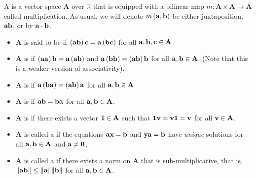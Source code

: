 \begin{dfn}
    A  is a vector space \( \mathbf{A} \) over \( \mathbb{R} \) that is equipped with a bilinear map \( m: \mathbf{A} \times \mathbf{A} \to \mathbf{A} \) called multiplication. As usual, we will denote \( m \left( \vb{a}, \vb{b} \right) \) be either juxtaposition, \( \vb{a} \vb{b} \), or by \( \vb{a} \cdot \vb{b} \). 
    \begin{itemize}
        \item \( \mathbf{A} \) is said to be   if \( \left( \vb{a} \vb{b} \right) \vb{c} = \vb{a} \left( \vb{b} \vb{c} \right) \) for all \( \vb{a}, \vb{b}, \vb{c} \in \mathbf{A} \) 
        \item \( \mathbf{A} \) is  if \( \left( \vb{a}\vb{a} \right) \vb{b} = \vb{a} \left( \vb{a} \vb{b} \right) \) and \( \vb{a} \left( \vb{b}  \vb{b} \right) = \left( \vb{a} \vb{b} \right) \vb{b}\) for all \( \vb{a}, \vb{b} \in \mathbf{A} \). (Note that this is a weaker version of associativity). 
        \item \( \mathbf{A} \) is  if \( \vb{a} \left(  \vb{b} \vb{a} \right) = \left( \vb{a} \vb{b} \right) \vb{a}\) for all \( \vb{a}, \vb{b} \in \mathbf{A} \)
        \item \( \mathbf{A} \) is  if \( \vb{a}\vb{b}= \vb{b}\vb{a} \) for all \( \vb{a}, \vb{b} \in \mathbf{A} \). 
        \item \( \mathbf{A} \) is  if there exists a vector \( \vb{1} \in \mathbf{A} \) such that \( \vb{1} \vb{v} = \vb{v} \vb{1} = \vb{v} \) for all \( \vb{v} \in \mathbf{A} \). 
        \item \( \mathbf{A} \) is called a  if the equations \( \vb{a} \vb{x} = \vb{b} \) and \( \vb{y} \vb{a} = \vb{b} \) have \emph{unique} solutions for all \( \vb{a}, \vb{b} \in \mathbf{A} \) and \( \vb{a} \neq \vb{0} \).
        \item \( \mathbf{A} \) is called a  if there exists a norm on \( \mathbf{A} \) that is sub-multiplicative, that is, \( \norm{\vb{a} \vb{b}} \le \norm{\vb{a}} \norm{\vb{b}}\) for all \( \vb{a}, \vb{b} \in \mathbf{A} \).
    \end{itemize}
\end{dfn}

